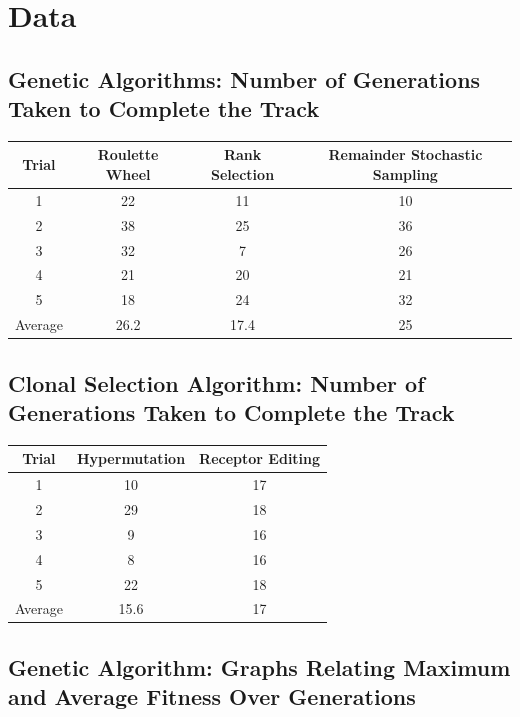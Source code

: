 \documentclass[]{interact}
\theoremstyle{plain} %
\theoremstyle{definition}
\theoremstyle{remark}
\begin{document}
\section{Data}

\subsection{Genetic Algorithms: Number of Generations Taken to Complete the Track}
\begin{table}[H]
\centering
\begin{tabular}{c|c|c|c}
Trial   & Roulette Wheel & Rank Selection & Remainder Stochastic Sampling \\ \hline
1       & 22             & 11             & 10                   \\
2       & 38             & 25             & 36                   \\
3       & 32             & 7              & 26                   \\
4       & 21             & 20             & 21                   \\ 
5       & 18             & 24             & 32                   \\ \hline
Average & 26.2           & 17.4           & 25                  
\end{tabular}
\end{table}

\subsection{Clonal Selection Algorithm: Number of Generations Taken to Complete the Track}
\begin{table}[H]
\centering
\begin{tabular}{c|c|c}
Trial   & Hypermutation & Receptor Editing \\ \hline
1       & 10            & 17               \\
2       & 29            & 18               \\
3       & 9             & 16               \\
4       & 8             & 16               \\
5       & 22            & 18               \\ \hline
Average & 15.6          & 17              
\end{tabular}
\end{table}

\subsection{Genetic Algorithm: Graphs Relating Maximum and Average Fitness Over Generations}
\end{document}
